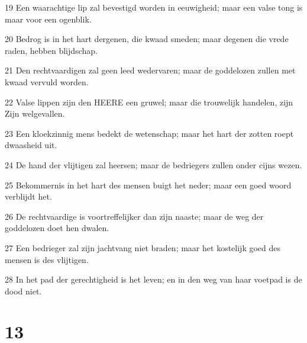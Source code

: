\par 19 Een waarachtige lip zal bevestigd worden in eeuwigheid; maar een valse tong is maar voor een ogenblik.
\par 20 Bedrog is in het hart dergenen, die kwaad smeden; maar degenen die vrede raden, hebben blijdschap.
\par 21 Den rechtvaardigen zal geen leed wedervaren; maar de goddelozen zullen met kwaad vervuld worden.
\par 22 Valse lippen zijn den HEERE een gruwel; maar die trouwelijk handelen, zijn Zijn welgevallen.
\par 23 Een kloekzinnig mens bedekt de wetenschap; maar het hart der zotten roept dwaasheid uit.
\par 24 De hand der vlijtigen zal heersen; maar de bedriegers zullen onder cijns wezen.
\par 25 Bekommernis in het hart des mensen buigt het neder; maar een goed woord verblijdt het.
\par 26 De rechtvaardige is voortreffelijker dan zijn naaste; maar de weg der goddelozen doet hen dwalen.
\par 27 Een bedrieger zal zijn jachtvang niet braden; maar het kostelijk goed des mensen is des vlijtigen.
\par 28 In het pad der gerechtigheid is het leven; en in den weg van haar voetpad is de dood niet.

\chapter{13}

